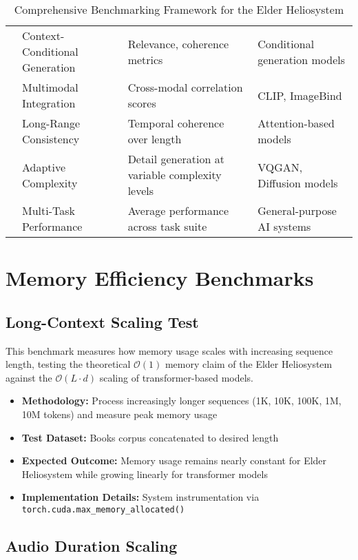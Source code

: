 \begin{table}[h]
\begin{tabular}{|p{3cm}|p{4cm}|p{4cm}|p{3cm}|}
& Context-Conditional Generation & Relevance, coherence metrics & Conditional generation models \\
\cline{2-4}
& Multimodal Integration & Cross-modal correlation scores & CLIP, ImageBind \\
\cline{2-4}
& Long-Range Consistency & Temporal coherence over length & Attention-based models \\
\cline{2-4}
& Adaptive Complexity & Detail generation at variable complexity levels & VQGAN, Diffusion models \\
\cline{2-4}
& Multi-Task Performance & Average performance across task suite & General-purpose AI systems \\
\hline
\end{tabular}
\caption{Comprehensive Benchmarking Framework for the Elder Heliosystem}
\end{table}

\section{Memory Efficiency Benchmarks}

\subsection{Long-Context Scaling Test}

This benchmark measures how memory usage scales with increasing sequence length, testing the theoretical $\mathcal{O}(1)$ memory claim of the Elder Heliosystem against the $\mathcal{O}(L \cdot d)$ scaling of transformer-based models.

\begin{itemize}
    \item \textbf{Methodology:} Process increasingly longer sequences (1K, 10K, 100K, 1M, 10M tokens) and measure peak memory usage
    \item \textbf{Test Dataset:} Books corpus concatenated to desired length
    \item \textbf{Expected Outcome:} Memory usage remains nearly constant for Elder Heliosystem while growing linearly for transformer models
    \item \textbf{Implementation Details:} System instrumentation via \texttt{torch.cuda.max\_memory\_allocated()}
\end{itemize}

\subsection{Audio Duration Scaling}

